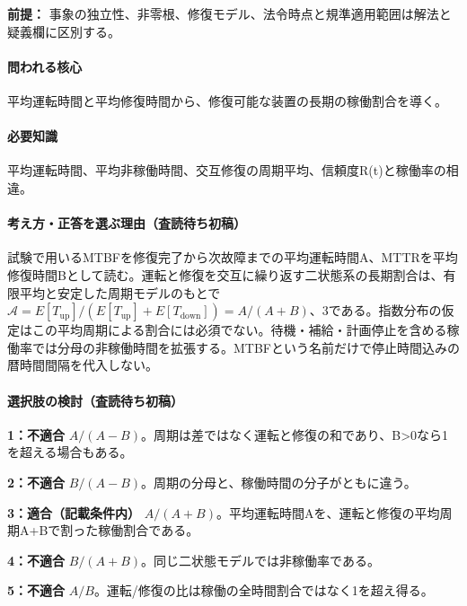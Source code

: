 \noindent\textbf{前提：} 事象の独立性、非零根、修復モデル、法令時点と規準適用範囲は解法と疑義欄に区別する。\par

\paragraph{問われる核心} 平均運転時間と平均修復時間から、修復可能な装置の長期の稼働割合を導く。

\paragraph{必要知識} 平均運転時間、平均非稼働時間、交互修復の周期平均、信頼度R(t)と稼働率の相違。

\paragraph{考え方・正答を選ぶ理由（査読待ち初稿）} 試験で用いるMTBFを修復完了から次故障までの平均運転時間A、MTTRを平均修復時間Bとして読む。運転と修復を交互に繰り返す二状態系の長期割合は、有限平均と安定した周期モデルのもとで \(\mathcal A=E[T_{\mathrm{up}}]/(E[T_{\mathrm{up}}]+E[T_{\mathrm{down}}])=A/(A+B)\)、3である。指数分布の仮定はこの平均周期による割合には必須でない。待機・補給・計画停止を含める稼働率では分母の非稼働時間を拡張する。MTBFという名前だけで停止時間込みの暦時間間隔を代入しない。

\paragraph{選択肢の検討（査読待ち初稿）}\mbox{}\par

\noindent\textbf{1：不適合} \(A/(A-B)\)。周期は差ではなく運転と修復の和であり、B>0なら1を超える場合もある。\par

\noindent\textbf{2：不適合} \(B/(A-B)\)。周期の分母と、稼働時間の分子がともに違う。\par

\noindent\textbf{3：適合（記載条件内）} \(A/(A+B)\)。平均運転時間Aを、運転と修復の平均周期A+Bで割った稼働割合である。\par

\noindent\textbf{4：不適合} \(B/(A+B)\)。同じ二状態モデルでは非稼働率である。\par

\noindent\textbf{5：不適合} \(A/B\)。運転/修復の比は稼働の全時間割合ではなく1を超え得る。\par

